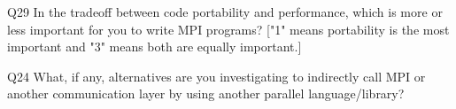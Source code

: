 \begin{description}%
\item{Q29} In the tradeoff between code portability and performance, which is more or less important for you to write MPI programs? ["1" means portability is the most important and "3" means both are equally important.]%
\item{Q24} What, if any, alternatives are you investigating to indirectly call MPI or another communication layer by using another parallel language/library?%
\end{description}%
